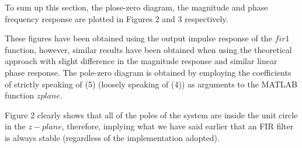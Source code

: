\documentclass[12pt]{IEEEtran}
\begin{document}
To sum up this section, the plose-zero diagram, the magnitude and phase frequency response are plotted in Figures 2 and 3 respectively. 

These figures have been obtained using the output impulse response of the $fir1$ function, however, similar results have been obtained when using the theoretical approach with slight difference in the magnitude response and similar linear phase response.
The pole-zero diagram is obtained by employing the coefficients of strictly speaking of (5) (loosely speaking of (4)) as arguments to the MATLAB function $zplane$.

Figure 2 clearly shows that all of the poles of the system are inside the unit circle in the $z-plane$, therefore, implying what we have said earlier that an FIR filter is always stable (regardless of the implementation adopted).
\end{document}

